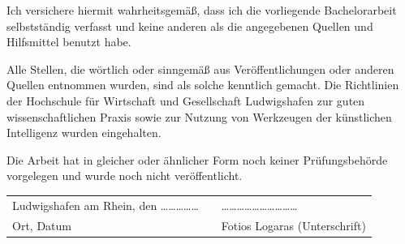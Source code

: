 \label{chap:erklaerung}

Ich versichere hiermit wahrheitsgemäß, dass ich die vorliegende Bachelorarbeit selbstständig verfasst und keine anderen als die angegebenen Quellen und Hilfsmittel benutzt habe.

Alle Stellen, die wörtlich oder sinngemäß aus Veröffentlichungen oder anderen Quellen entnommen wurden, sind als solche kenntlich gemacht. Die Richtlinien der Hochschule für Wirtschaft und Gesellschaft Ludwigshafen zur guten wissenschaftlichen Praxis sowie zur Nutzung von Werkzeugen der künstlichen Intelligenz wurden eingehalten.

Die Arbeit hat in gleicher oder ähnlicher Form noch keiner Prüfungsbehörde vorgelegen und wurde noch nicht veröffentlicht.

\vspace{3.0cm}

\noindent
\begin{tabular}{@{}p{5.5cm}p{1.5cm}p{6.0cm}@{}}
Ludwigshafen am Rhein, den \dots\dots\dots\dots\dots & & \dots\dots\dots\dots\dots\dots\dots\dots\dots\dots \\
Ort, Datum & & Fotios Logaras (Unterschrift)
\end{tabular}
